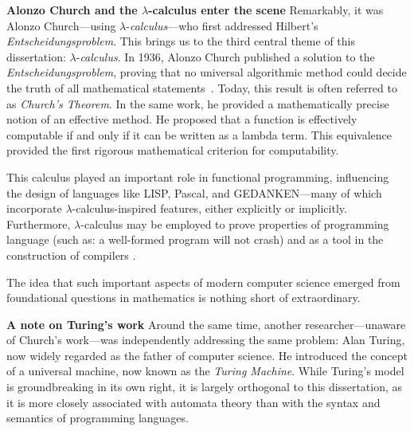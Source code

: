    

\noindent \textbf{Alonzo Church and the $\lambda$-calculus enter the scene}
Remarkably, it was Alonzo Church—using $\lambda$-\textit{calculus}—who first addressed Hilbert’s \emph{Entscheidungsproblem}. This brings us to the third central theme of this dissertation: $\lambda$-\textit{calculus}. In 1936, Alonzo Church published a solution to the \emph{Entscheidungsproblem}, proving that no universal algorithmic method could decide the truth of all mathematical statements~\cite{church1936}. Today, this result is often referred to as \emph{Church’s Theorem}. In the same work, he provided a mathematically precise notion of an effective method. He proposed that a function is effectively computable if and only if it can be written as a lambda term. This equivalence provided the first rigorous mathematical criterion for computability.

This calculus played an important role in functional programming, influencing the design of languages like LISP, Pascal, and GEDANKEN—many of which incorporate $\lambda$-calculus-inspired features, either explicitly or implicitly. Furthermore, $\lambda$-calculus may be employed to prove properties of programming language (such as: a well-formed program will not crash) and as a tool in the construction of compilers \cite{jonesImplementationFunctionalProgramming}.

The idea that such important aspects of modern computer science emerged from foundational questions in mathematics is nothing short of extraordinary.

\noindent \textbf{A note on Turing's work}
Around the same time, another researcher—unaware of Church’s work—was independently addressing the same problem: Alan Turing, now widely regarded as the father of computer science. He introduced the concept of a universal machine, now known as the \emph{Turing Machine}. While Turing’s model is groundbreaking in its own right, it is largely orthogonal to this dissertation, as it is more closely associated with automata theory than with the syntax and semantics of programming languages.



